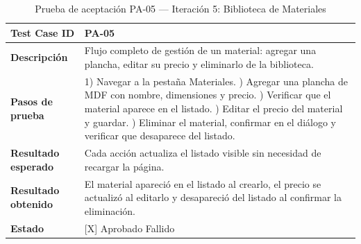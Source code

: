 ﻿\documentclass{iccmemoria}
\begin{document}
\begin{table}[H]
\centering
\caption{Prueba de aceptación PA-05 — Iteración 5: Biblioteca de Materiales}
\label{tab:pa05}
\begin{tabular}{|p{4cm}|p{9.5cm}|}
\hline
\textbf{Test Case ID} & PA-05 \\
\hline
\textbf{Descripción} & Flujo completo de gestión de un material: agregar una plancha, editar su precio y eliminarlo de la biblioteca. \\
\hline
\textbf{Pasos de prueba} &
1) Navegar a la pestaña Materiales. \newline
2) Agregar una plancha de MDF con nombre, dimensiones y precio. \newline
3) Verificar que el material aparece en el listado. \newline
4) Editar el precio del material y guardar. \newline
5) Eliminar el material, confirmar en el diálogo y verificar que desaparece del listado. \\
\hline
\textbf{Resultado esperado} & Cada acción actualiza el listado visible sin necesidad de recargar la página. \\
\hline
\textbf{Resultado obtenido} & El material apareció en el listado al crearlo, el precio se actualizó al editarlo y desapareció del listado al confirmar la eliminación. \\
\hline
\textbf{Estado} & {[X]} Aprobado \quad {[ ]} Fallido \\
\hline
\end{tabular}
\end{table}
\end{document}
